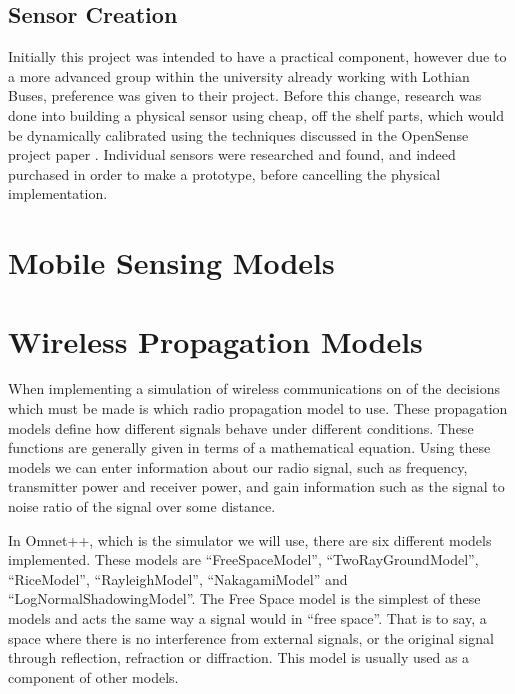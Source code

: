     \subsection{Sensor Creation}

        Initially this project was intended to have a practical component, however due to a more advanced group within the university already working with Lothian Buses, preference was given to their project. Before this change, research was done into building a physical sensor using cheap, off the shelf parts, which would be dynamically calibrated using the techniques discussed in the OpenSense project paper \cite{ontheflycalibration}. Individual sensors were researched and found, and indeed purchased in order to make a prototype, before cancelling the physical implementation. 
    




\section{Mobile Sensing Models}\label{background_mobile_sensing_models}



\section{Wireless Propagation Models}


    When implementing a simulation of wireless communications on of the decisions which must be made is which radio propagation model to use. These propagation models define how different signals behave under different conditions. These functions are generally given in terms of a mathematical equation. Using these models we can enter information about our radio signal, such as frequency, transmitter power and receiver power,  and gain information such as the signal to noise ratio of the signal over some distance.

    In Omnet++, which is the simulator we will use, there are six different models implemented. These models are ``FreeSpaceModel'', ``TwoRayGroundModel'', ``RiceModel'', ``RayleighModel'', ``NakagamiModel'' and ``LogNormalShadowingModel''. The Free Space model is the simplest of these models and acts the same way a signal would in ``free space''. That is to say, a space where there is no interference from external signals, or the original signal through reflection, refraction or diffraction. This model is usually used as a component of other models. 

